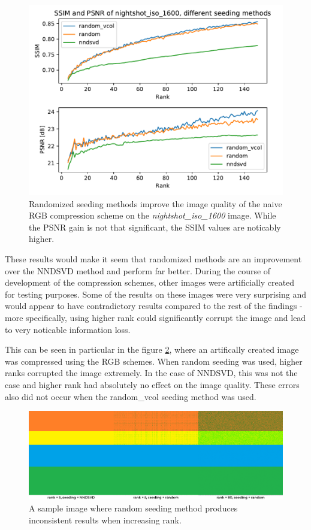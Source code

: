 \documentclass[thesis=M,english]{FITthesis}[2012/10/20]
\begin{document}
\begin{figure}[h]
  \centering
  \includegraphics[scale=0.7]{imgs/results/diff_methods}
  \caption[Randomized seeding methods on a benchmark picture]{Randomized seeding methods
  improve the image quality of the naive RGB compression scheme on the \emph{nightshot\_iso\_1600}
  image. While the PSNR gain is not that significant, the SSIM values are noticably higher.}
  \label{fig:diff_methods}
\end{figure}

These results would make it seem that randomized methods are an improvement over the
NNDSVD method and perform far better. During the course of development of the compression
schemes, other images were artificially created for testing purposes. Some of the results
on these images were very surprising and would appear to have contradictory results
compared to the rest of the findings - more specifically, using higher rank could significantly
corrupt the image and lead to very noticable information loss.

This can be seen in particular in the figure \ref{fig:random-seed}, where an artifically
created image was compressed using the RGB schemes. When random seeding was used, higher ranks
corrupted the image extremely. In the case of NNDSVD, this was not the case and higher rank
had absolutely no effect on the image quality. These errors also did not occur when the
random\_vcol seeding method was used.

\begin{figure}[h]
  \centering
  \includegraphics[scale=0.5]{imgs/random-seed-artifacts}
  \caption[Artifacts created by using a random seeding method]{A sample image where random
           seeding method produces inconsistent results when increasing rank.}
  \label{fig:random-seed}
\end{figure}
\end{document}
